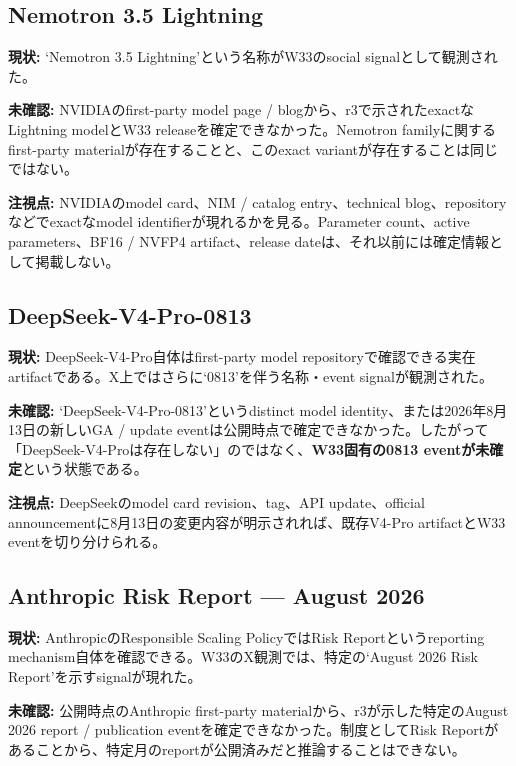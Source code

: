\subsection*{Nemotron 3.5 Lightning}

\textbf{現状:} `Nemotron 3.5 Lightning'という名称がW33のsocial signalとして観測された\cite{w33-grok-r3-observation}。

\textbf{未確認:} NVIDIAのfirst-party model page / blogから、r3で示されたexactなLightning modelとW33 releaseを確定できなかった。Nemotron familyに関するfirst-party materialが存在することと、このexact variantが存在することは同じではない\cite{w33-grok-r3-review}。

\textbf{注視点:} NVIDIAのmodel card、NIM / catalog entry、technical blog、repositoryなどでexactなmodel identifierが現れるかを見る。Parameter count、active parameters、BF16 / NVFP4 artifact、release dateは、それ以前には確定情報として掲載しない。

\subsection*{DeepSeek-V4-Pro-0813}

\textbf{現状:} DeepSeek-V4-Pro自体はfirst-party model repositoryで確認できる実在artifactである\cite{deepseek-v4pro}。X上ではさらに`0813'を伴う名称・event signalが観測された\cite{w33-grok-r3-observation}。

\textbf{未確認:} `DeepSeek-V4-Pro-0813'というdistinct model identity、または2026年8月13日の新しいGA / update eventは公開時点で確定できなかった\cite{w33-grok-r3-review}。したがって「DeepSeek-V4-Proは存在しない」のではなく、\textbf{W33固有の0813 eventが未確定}という状態である。

\textbf{注視点:} DeepSeekのmodel card revision、tag、API update、official announcementに8月13日の変更内容が明示されれば、既存V4-Pro artifactとW33 eventを切り分けられる。

\subsection*{Anthropic Risk Report --- August 2026}

\textbf{現状:} AnthropicのResponsible Scaling PolicyではRisk Reportというreporting mechanism自体を確認できる\cite{anthropic-rsp-w33}。W33のX観測では、特定の`August 2026 Risk Report'を示すsignalが現れた\cite{w33-grok-r3-observation}。

\textbf{未確認:} 公開時点のAnthropic first-party materialから、r3が示した特定のAugust 2026 report / publication eventを確定できなかった\cite{w33-grok-r3-review}。制度としてRisk Reportがあることから、特定月のreportが公開済みだと推論することはできない。

